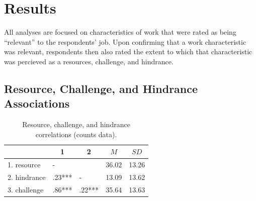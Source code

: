 \documentclass[
  man]{apa6}
\begin{document}
\hypertarget{results}{%
\section{Results}\label{results}}

All analyses are focused on characteristics of work that were rated as being ``relevant'' to the respondents' job. Upon confirming that a work characteristic was relevant, respondents then also rated the extent to which that characteristic was percieved as a resources, challenge, and hindrance.

\hypertarget{resource-challenge-and-hindrance-associations}{%
\subsection{Resource, Challenge, and Hindrance Associations}\label{resource-challenge-and-hindrance-associations}}

\begin{table}[tbp]

\begin{center}
\begin{threeparttable}

\caption{\label{tab:cortab}Resource, challenge, and hindrance correlations (counts data).}

\begin{tabular}{lllll}
\toprule
 & \multicolumn{1}{c}{1} & \multicolumn{1}{c}{2} & \multicolumn{1}{c}{$M$} & \multicolumn{1}{c}{$SD$}\\
\midrule
1. resource & - &  & 36.02 & 13.26\\
2. hindrance & .23*** & - & 13.09 & 13.62\\
3. challenge & .86*** & .22*** & 35.64 & 13.63\\
\bottomrule
\end{tabular}

\end{threeparttable}
\end{center}

\end{table}
\end{document}

